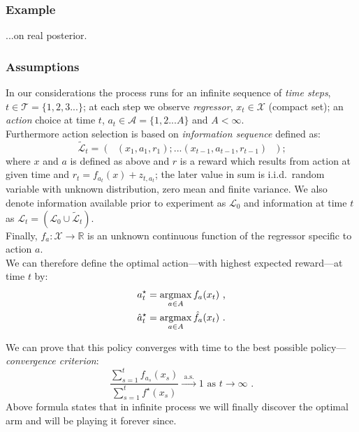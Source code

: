 \documentclass[12pt, a4paper, pdflatex, leqno]{report}
\newcommand{\argmax}{\operatornamewithlimits{argmax}}
\begin{document}
\subsubsection{Example}
...on real posterior.\\








\subsubsection{Assumptions}
In our considerations the process runs for an infinite sequence of \emph{time steps}, $t \in \mathscr{T} = \{ 1,2,3... \}$; at each step we observe \emph{regressor}, $x_t \in \mathscr{X}$ (compact set); an \emph{action} choice at time $t$, $a_t \in \mathscr{A} = \{ 1,2...A \}$ and $A<\infty$.\\
Furthermore action selection is based on \emph{information sequence} defined as:
$$
  \tilde{\mathscr{L}}_t = \left( \text{  } (x_1,a_1,r_1);...(x_{t-1},a_{t-1},r_{t-1}) \text{  } \right) \text{;}
$$
where $x$ and $a$ is defined as above and $r$ is a reward which results from action at given time and $r_t = f_{a_t}(x) + z_{t,a_t}$; the later value in sum is i.i.d.\ random variable with unknown distribution, zero mean and finite variance. We also denote information available prior to experiment as $\mathscr{L}_0$ and information at time $t$ as $\mathscr{L}_t = \left( \mathscr{L}_0 \cup \tilde{\mathscr{L}}_t \right)$.\\
Finally, $f_a : \mathscr{X} \rightarrow \mathbb{R}$ is an unknown continuous function of the regressor specific to action $a$.\\



We can therefore define the optimal action---with highest expected reward---at time $t$ by:
\begin{eqnarray}
  a_t^\star = \argmax_{a \in A} f_a (x_t) \text{ ,}\\
  \label{eqn:optsol} \hat{a}_t^\star = \argmax_{a \in A} \hat{f}_a (x_t) \text{ .}
\end{eqnarray}

We can prove that this policy converges with time to the best possible policy---\emph{convergence criterion}:
\begin{equation}
  \label{eqn:convg}
  \frac
    {\sum_{s=1}^t f_{a_s} (x_s)}
    {\sum_{s=1}^t f^\star (x_s)}
  \xrightarrow{\text{ a.s.\ }} 1 \text{ as } t \rightarrow \infty \text{ .}
\end{equation}
Above formula states that in infinite process we will finally discover the optimal arm and will be playing it forever since.\\
\end{document}
